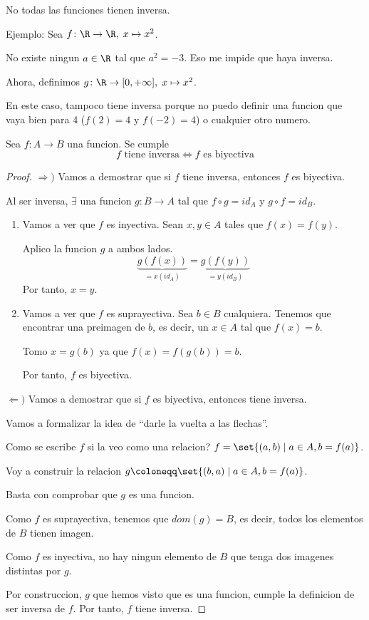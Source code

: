 \begin{remark}
	No todas las funciones tienen inversa.

	Ejemplo: Sea \(f \colon \R \to \R, \; x \mapsto x^{2 } \).

	No existe ningun \(a \in \R \) tal que \(a^{2 } = -3\). Eso me impide que haya inversa.

	Ahora, definimos \(g \colon \R \to [0,+\infty], \; x \mapsto x^{2} \).

	En este caso, tampoco tiene inversa porque no puedo definir una funcion que vaya bien para 4 (\(f(2) = 4 \) y \(f(-2) = 4\)) o cualquier otro numero.
\end{remark}

\begin{theorem}
	Sea \(f \colon  A \to B \) una funcion. Se cumple
	\[
		f \text{ tiene inversa} \iff  f \text{ es biyectiva}
	\]
\end{theorem}
\begin{proof}
	\(\Rightarrow ) \) Vamos a demostrar que si \(f \) tiene inversa, entonces \( f \) es biyectiva.

	Al ser inversa, \(\exists \) una funcion \(g \colon B \to A \) tal que \(f \circ g = id_A\) y \(g \circ  f = id_B \).
	\begin{enumerate}
		\item Vamos a ver que \(f \) es inyectiva. Sean \(x,y \in A\) tales que \(f(x) = f(y )\).

		      Aplico la funcion \(g \) a ambos lados.
		      \[
			      \underbrace{g(f(x))}_{= x (id_A)} = \underbrace{g(f(y ))}_{= y (id_B)}
		      \]
		      Por tanto, \(x = y \).
		\item Vamos a ver que \(f \) es suprayectiva. Sea \(b \in B \) cualquiera. Tenemos que encontrar una preimagen de \(b \), es decir, un \(x \in A \) tal que \(f(x) = b \).

		      Tomo \(x = g(b)\) ya que \(f(x) = f(g(b )) = b\).

		      Por tanto, \(f \) es biyectiva.
	\end{enumerate}

	\(\Leftarrow ) \) Vamos a demostrar que si \(f \) es biyectiva, entonces tiene inversa.

	Vamos a formalizar la idea de ``darle la vuelta a las flechas''.

	Como se escribe \(f \) si la veo como una relacion? \(f = \set{(a,b) \mid a \in A, b = f(a )}\).

	Voy a construir la relacion \(g \coloneqq \set{(b,a) \mid a \in A, b = f(a)}\).

	Basta con comprobar que \(g \) es una funcion.

	Como \(f \) es suprayectiva, tenemos que \(dom(g) = B\), es decir, todos los elementos de \(B\) tienen imagen.

	Como \(f \) es inyectiva, no hay ningun elemento de \(B \) que tenga dos imagenes distintas por \(g \).

	Por construccion, \(g \) que hemos visto que es una funcion, cumple la definicion de ser inversa de \(f \). Por tanto, \(f \) tiene inversa.
\end{proof}

